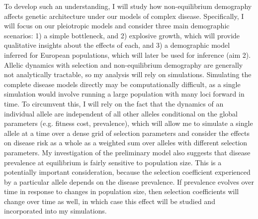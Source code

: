 \message{ !name(ResearchStrategy.tex)}\documentclass[11pt]{article}
\begin{document}
To develop such an understanding, I will study how non-equilibrium demography affects genetic architecture under our models of complex disease. Specifically, I will focus on our pleiotropic models and consider three main demographic scenarios: 1) a simple bottleneck, and 2) explosive growth, which will provide qualitative insights about the effects of each, and 3) a demographic model inferred for European populations\cite{Tennessen:2012ek, Schiffels:2014cu}, which will later be used for inference (aim 2).  Allelic dynamics with selection and non-equilibrium demography are generally not analytically tractable, so my analysis will rely on simulations. Simulating the complete disease models directly may be computationally difficult, as a single simulation would involve running a large population with many loci forward in time. To circumvent this, I will rely on the fact that the dynamics of an individual allele are independent of all other alleles conditional on the global parameters (e.g. fitness cost, prevalence), which will allow me to simulate a single allele at a time over a dense grid of selection parameters and consider the effects on disease risk as a whole as a weighted sum over alleles with different selection parameters. My investigation of the preliminary model also suggests that disease prevalence at equilibrium is fairly sensitive to population size. This is a potentially important consideration, because the selection coefficient experienced by a particular allele depends on the disease prevalence. If prevalence evolves over time in response to changes in population size, then selection coefficients will change over time as well, in which case this effect will be studied and incorporated into my simulations.

\end{document}
